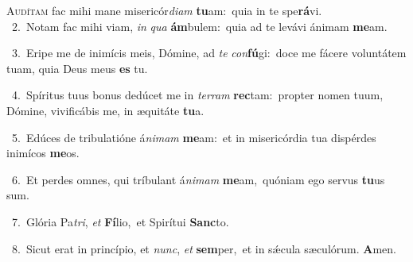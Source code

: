 \lettrine{\initial\textcolor{\initialcolor}{A}}{udítam} fac mihi mane misericór\-\textit{di}\-\textit{am} \textbf{tu}\-am:~\star quia in te spe\-\textbf{rá}\-vi.\\
{\numbfont\textcolor{\numbcolor}{~2.}}~Notam fac mihi viam, \textit{in} \textit{qua} \textbf{ám}\-bulem:~\star quia ad te levávi ánimam \textbf{me}\-am.\par
{\numbfont\textcolor{\numbcolor}{~3.}}~Eripe me de inimícis meis, Dómine, ad \textit{te} \textit{con}\-\textbf{fú}gi:~\star doce me fácere voluntátem tuam, quia Deus meus \textbf{es} tu.\par
{\numbfont\textcolor{\numbcolor}{~4.}}~Spíritus tuus bonus dedúcet me in \textit{ter}\-\textit{ram} \textbf{rec}\-tam:~\star propter nomen tuum, Dómine, vivificábis me, in æquitáte \textbf{tu}\-a.\par
{\numbfont\textcolor{\numbcolor}{~5.}}~Edúces de tribulatióne á\-\textit{ni}\-\textit{mam} \textbf{me}\-am:~\star et in misericórdia tua dispérdes inimícos \textbf{me}\-os.\par
{\numbfont\textcolor{\numbcolor}{~6.}}~Et perdes omnes, qui tríbulant á\-\textit{ni}\-\textit{mam} \textbf{me}\-am,~\star quóniam ego servus \textbf{tu}\-us sum.\par
{\numbfont\textcolor{\numbcolor}{~7.}}~Glória Pa\-\textit{tri}\-, \textit{et} \textbf{Fí}\-lio,~\star et Spirítui \textbf{Sanc}\-to.\par
{\numbfont\textcolor{\numbcolor}{~8.}}~Sicut erat in princípio, et \textit{nunc}\-, \textit{et} \textbf{sem}\-per,~\star et in sǽcula sæculórum. \textbf{A}\-men.\par
